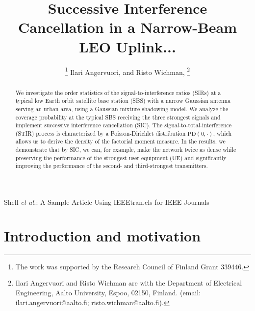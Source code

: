 \documentclass[lettersize,journal]{IEEEtran}
\begin{document}
\title{Successive Interference Cancellation in a Narrow-Beam LEO Uplink...}
\author{
  \thanks{The work was supported by the Research Council of Finland Grant 339446.}
   Ilari Angervuori,   and Risto Wichman,  \thanks{Ilari Angervuori and Risto Wichman are with the Department of Electrical Engineering, Aalto University, Espoo, 02150, Finland. (email: ilari.angervuori@aalto.fi; risto.wichman@aalto.fi).}
 }

%
{Shell \MakeLowercase{\textit{et al.}}: A Sample Article Using IEEEtran.cls for IEEE Journals}

\IEEEpubid{}


\maketitle
\begin{abstract}
  We investigate the order statistics of the signal-to-interference ratios (SIRs) at a typical low Earth orbit satellite base station (SBS) with a narrow Gaussian antenna serving an urban area, using a Gaussian mixture shadowing model. We analyze the coverage probability at the typical SBS receiving the three strongest signals and implement successive interference cancellation (SIC). The signal-to-total-interference (STIR) process is characterized by a Poisson-Dirichlet distribution $\text{PD}(0, \cdot)$, which allows us to derive the density of the factorial moment measure. In the results, we demonstrate that by SIC, we can, for example, make the network twice as dense while preserving the performance of the strongest user equipment (UE) and significantly improving the performance of the second- and third-strongest transmitters.
\end{abstract}



\section{Introduction and motivation}
\end{document}
